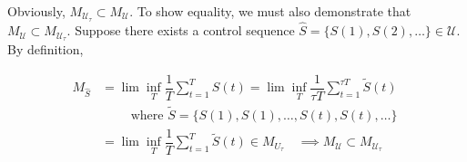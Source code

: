 \begin{IEEEproof}
Obviously, $M_{\mathcal U_\tau}  \subset M_{\mathcal U}$. To show equality, we must also demonstrate that $M_{\mathcal U}  \subset M_{\mathcal {U}_\tau} $. Suppose there exists a control sequence $\hat{S} = \{ S(1), S(2), \ldots \} \in \mathcal{U}$. 
By definition, \begin{small}
\begin{align*}
M_{\hat{S}} &= \lim\inf_{T} \dfrac{1}{T}\sum_{t=1}^{T} S(t) = \lim\inf_{T} \dfrac{1}{\tau T}\sum_{t=1}^{\tau T}  \tilde{S}(t) \; \\ 
& \qquad \text{ where } \tilde{S} = \{S(1), S(1), \ldots, S(t), S(t), \ldots \} \\
&= \lim\inf_{T} \dfrac{1}{ T}\sum_{t=1}^{T}  \tilde{S}(t) \in M_{U_\tau}  \quad \implies M_{\mathcal U}  \subset M_{\mathcal {U}_\tau}
\end{align*}\end{small}
\end{IEEEproof}
